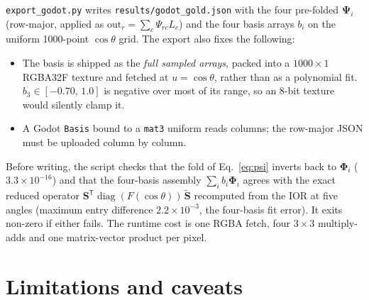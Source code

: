 \documentclass[11pt,a4paper]{article}
\newcommand{\mS}{\mathbf{S}}
\newcommand{\mSd}{\tilde{\mathbf{S}}}
\newcommand{\mPhi}{\boldsymbol{\Phi}}
\newcommand{\mPsi}{\boldsymbol{\Psi}}
\newcommand{\diag}{\operatorname{diag}}
\newcommand{\transp}{^{\mathsf{T}}}
\newcommand{\file}[1]{\texttt{#1}}
\newcommand{\code}[1]{\texttt{#1}}
\begin{document}
\file{export\_godot.py} writes \file{results/godot\_gold.json} with the four
pre-folded $\mPsi_i$ (row-major, applied as $\text{out}_r=\sum_c\Psi_{rc}L_c$)
and the four basis arrays $b_i$ on the uniform 1000-point $\cos\theta$ grid.
The export also fixes the following:
\begin{itemize}[nosep]
  \item The basis is shipped as the \emph{full sampled arrays}, packed into a
        $1000\times1$ RGBA32F texture and fetched at $u=\cos\theta$, rather than
        as a polynomial fit.  $b_3\in[-0.70,\,1.0]$ is negative over most of its
        range, so an 8-bit texture would silently clamp it.
  \item A Godot \code{Basis} bound to a \code{mat3} uniform reads columns;
        the row-major JSON must be uploaded column by column.
\end{itemize}
Before writing, the script checks that the fold of Eq.~\eqref{eq:psi} inverts
back to $\mPhi_i$ ($3.3\times10^{-16}$) and that the four-basis assembly
$\sum_i b_i\mPhi_i$ agrees with the exact reduced operator
$\mS\transp\diag(F(\cos\theta))\,\mSd$ recomputed from the IOR at five angles
(maximum entry difference $2.2\times10^{-3}$, the four-basis fit error).  It
exits non-zero if either fails.  The runtime cost is one RGBA fetch, four
$3\times3$ multiply-adds and one matrix-vector product per pixel.

\section{Limitations and caveats}
\label{sec:limits}
\end{document}
